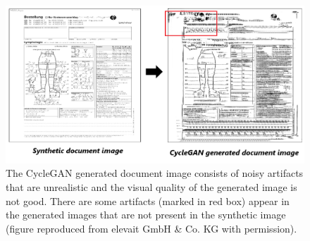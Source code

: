 \begin{figure}[H]
        \begin{center}
	    \includegraphics[scale=0.50]{images/Evaluation/failure4.png}
	    \caption[There are some artifacts appear in the generated image that are not present in the synthetic image.]{The \ac{CycleGAN} generated document image consists of noisy artifacts that are unrealistic and the visual quality of the generated image is not good. There are some artifacts (marked in red box) appear in the generated images that are not present in the synthetic image (figure reproduced from elevait GmbH \& Co. KG with permission).}
	    \label{fig:failure4}
	    \end{center}
\end{figure}








































